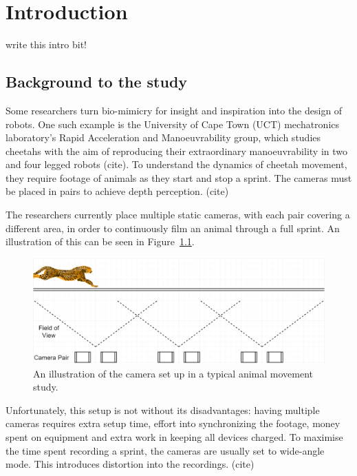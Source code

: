 \chapter{Introduction}
{\color{red} write this intro bit!}

\section{Background to the study}
Some researchers turn bio-mimicry for insight and inspiration into the design of robots. One such example is the University of Cape Town (UCT) mechatronics laboratory's Rapid Acceleration and Manoeuvrability group, which studies cheetahs with the aim of reproducing their extraordinary manoeuvrability in two and four legged robots {\color{red} (cite)}. To understand the dynamics of cheetah movement, they require footage of animals as they start and stop a sprint. The cameras must be placed in pairs to achieve depth perception. {\color{red} (cite)}

The researchers currently place multiple static cameras, with each pair covering a different area, in order to continuously film an animal through a full sprint. An illustration of this can be seen in Figure~\ref{fig:multiple_gopro_pairs}. \\

\begin{figure}[h!]
  \centering
  \includegraphics[width=\textwidth]{multiple_gopro_pairs}
  \caption{\label{fig:multiple_gopro_pairs} An illustration of the camera set up in a typical animal movement study.}
\end{figure}

Unfortunately, this setup is not without its disadvantages: having multiple cameras requires extra setup time, effort into synchronizing the footage, money spent on equipment and extra work in keeping all devices charged. To maximise the time spent recording a sprint, the cameras are usually set to wide-angle mode. This introduces distortion into the recordings. {\color{red} (cite)}

